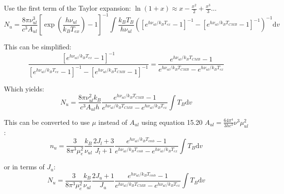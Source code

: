 \documentclass[preprint]{aastex}
\newcommand{\dv}{\ensuremath{\textrm{d}v}}
\begin{document}
Use the first term of the Taylor expansion: $\ln(1+x)\approx x-\frac{x^2}{2}+\frac{x^3}{3}\ldots$
\begin{equation}
  N_u = \frac{8\pi \nu_{ul}^3}{c^3 A_{ul}} \left[\exp\left(\frac{h \nu_{ul} }{k_B T_{ex}}\right) - 1 \right]^{-1} \int \frac{k_B T_B}{h \nu_{ul}} \left(\left[e^{h \nu_{ul} / k_B T_{ex}} - 1\right]^{-1} - \left[e^{h \nu_{ul} / k_B T_{CMB}} - 1\right]^{-1} \right)^{-1} \dv
\end{equation}

This can be simplified:
\begin{equation}
  \frac{ \left[e^{h \nu_{ul} /k_B T_{ex}} - 1 \right]^{-1} }{\left[e^{h \nu_{ul} / k_B T_{ex}} - 1\right]^{-1} - \left[e^{h \nu_{ul} / k_B T_{CMB}} - 1\right]^{-1} } = \frac{e^{h\nu_{ul}/k_B T_{CMB}} - 1}{e^{h\nu_{ul}/k_B T_{CMB}} - e^{h\nu_{ul}/k_B T_{ex}}}
\end{equation}

Which yields:
\begin{equation}
  \label{eqn:nupper}
  N_u = \frac{8\pi \nu_{ul}^2 k_B}{c^3 A_{ul} h }  \frac{e^{h\nu_{ul}/k_B T_{CMB}} - 1}{e^{h\nu_{ul}/k_B T_{CMB}} - e^{h\nu_{ul}/k_B T_{ex}}} \int T_B  \dv
\end{equation}

This can be converted to use $\mu$ instead of $A_{ul}$ using \citet{rohlfs} equation 15.20 $A_{ul}=\frac{64\pi^4}{3 h c^3}\nu^3 \mu_{ul}^2$:
\begin{equation}
  \label{eqn:nuppermu}
  n_u = \frac{3  }{8 \pi^3 \mu_e^2 } \frac{k_B}{\nu_{ul}} \frac{2 J_l + 3}{J_l+1} 
    \frac{e^{h\nu_{ul}/k_B T_{cmb}} - 1}{e^{h\nu_{ul}/k_B T_{cmb}} - e^{h\nu_{ul}/k_B T_{ex}}} \int T_B  \dv
\end{equation}

or in terms of $J_u$:
\begin{equation}
  \label{eqn:nuppermuju}
  N_u = \frac{3  }{8 \pi^3 \mu_e^2 } \frac{k_B}{\nu_{ul}} \frac{2 J_u + 1}{J_u} 
    \frac{e^{h\nu_{ul}/k_B T_{cmb}} - 1}{e^{h\nu_{ul}/k_B T_{CMB}} - e^{h\nu_{ul}/k_B T_{ex}}} \int T_B  \dv
\end{equation}
\end{document}
